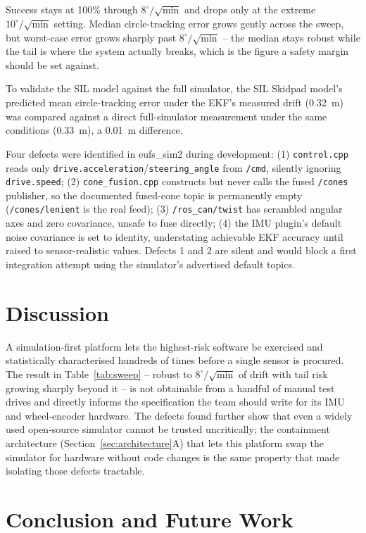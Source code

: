 \documentclass[conference]{IEEEtran}
\begin{document}
Success stays at 100\% through $8^{\circ}/\sqrt{\text{min}}$ and drops only at the extreme $10^{\circ}/\sqrt{\text{min}}$ setting. Median circle-tracking error grows gently across the sweep, but worst-case error grows sharply past $8^{\circ}/\sqrt{\text{min}}$ -- the median stays robust while the tail is where the system actually breaks, which is the figure a safety margin should be set against.

To validate the SIL model against the full simulator, the SIL Skidpad model's predicted mean circle-tracking error under the EKF's measured drift (0.32~m) was compared against a direct full-simulator measurement under the same conditions (0.33~m), a 0.01~m difference.

Four defects were identified in eufs\_sim2 during development: (1) \texttt{control.cpp} reads only \texttt{drive.acceleration}/\texttt{steering\_angle} from \texttt{/cmd}, silently ignoring \texttt{drive.speed}; (2) \texttt{cone\_fusion.cpp} constructs but never calls the fused \texttt{/cones} publisher, so the documented fused-cone topic is permanently empty (\texttt{/cones/lenient} is the real feed); (3) \texttt{/ros\_can/twist} has scrambled angular axes and zero covariance, unsafe to fuse directly; (4) the IMU plugin's default noise covariance is set to identity, understating achievable EKF accuracy until raised to sensor-realistic values. Defects 1 and 2 are silent and would block a first integration attempt using the simulator's advertised default topics.

\section{Discussion}

A simulation-first platform lets the highest-risk software be exercised and statistically characterised hundreds of times before a single sensor is procured. The result in Table~\ref{tab:sweep} -- robust to $8^{\circ}/\sqrt{\text{min}}$ of drift with tail risk growing sharply beyond it -- is not obtainable from a handful of manual test drives and directly informs the specification the team should write for its IMU and wheel-encoder hardware. The defects found further show that even a widely used open-source simulator cannot be trusted uncritically; the containment architecture (Section~\ref{sec:architecture}A) that lets this platform swap the simulator for hardware without code changes is the same property that made isolating those defects tractable.

\section{Conclusion and Future Work}
\end{document}
